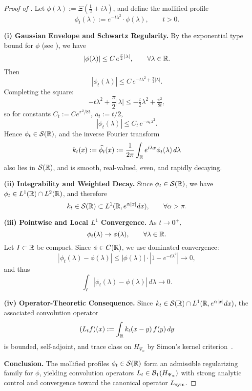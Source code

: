 \begin{proof}[Proof of ]
Let \( \phi(\lambda) := \Xi\left( \tfrac{1}{2} + i\lambda \right) \), and define the mollified profile
\[
\phi_t(\lambda) := e^{-t\lambda^2} \cdot \phi(\lambda), \qquad t > 0.
\]

\smallskip
\noindent\textbf{(i) Gaussian Envelope and Schwartz Regularity.}  
By the exponential type bound for \( \phi \) (see ), we have
\[
|\phi(\lambda)| \le C\, e^{\frac{\pi}{2} |\lambda|}, \qquad \forall \lambda \in \mathbb{R}.
\]
Then
\[
|\phi_t(\lambda)| \le C\, e^{-t\lambda^2 + \frac{\pi}{2} |\lambda|}.
\]
Completing the square:
\[
-t\lambda^2 + \frac{\pi}{2}|\lambda| \le -\tfrac{t}{2} \lambda^2 + \tfrac{\pi^2}{8t},
\]
so for constants \( C_t := C e^{\pi^2 / 8t} \), \( a_t := t/2 \),
\[
|\phi_t(\lambda)| \le C_t\, e^{-a_t \lambda^2}.
\]
Hence \( \phi_t \in \mathcal{S}(\mathbb{R}) \), and the inverse Fourier transform
\[
k_t(x) := \widehat{\phi_t}(x) := \frac{1}{2\pi} \int_{\mathbb{R}} e^{i\lambda x} \phi_t(\lambda)\, d\lambda
\]
also lies in \( \mathcal{S}(\mathbb{R}) \), and is smooth, real-valued, even, and rapidly decaying.

\smallskip
\noindent\textbf{(ii) Integrability and Weighted Decay.}  
Since \( \phi_t \in \mathcal{S}(\mathbb{R}) \), we have \( \phi_t \in L^1(\mathbb{R}) \cap L^2(\mathbb{R}) \), and therefore
\[
k_t \in \mathcal{S}(\mathbb{R}) \subset L^1(\mathbb{R}, e^{\alpha |x|} dx), \qquad \forall \alpha > \pi.
\]

\smallskip
\noindent\textbf{(iii) Pointwise and Local \( L^1 \) Convergence.}  
As \( t \to 0^+ \),
\[
\phi_t(\lambda) \to \phi(\lambda), \qquad \forall \lambda \in \mathbb{R}.
\]
Let \( I \subset \mathbb{R} \) be compact. Since \( \phi \in C(\mathbb{R}) \), we use dominated convergence:
\[
|\phi_t(\lambda) - \phi(\lambda)| \le |\phi(\lambda)| \cdot |1 - e^{-t\lambda^2}| \to 0,
\]
and thus
\[
\int_I |\phi_t(\lambda) - \phi(\lambda)|\, d\lambda \to 0.
\]

\smallskip
\noindent\textbf{(iv) Operator-Theoretic Consequence.}  
Since \( k_t \in \mathcal{S}(\mathbb{R}) \cap L^1(\mathbb{R}, e^{\alpha |x|} dx) \), the associated convolution operator
\[
(L_t f)(x) := \int_{\mathbb{R}} k_t(x - y)\, f(y)\, dy
\]
is bounded, self-adjoint, and trace class on \( H_{\Psi_\alpha} \) by Simon’s kernel criterion~\cite[Thm.~4.2]{Simon2005TraceIdeals}.

\smallskip
\noindent\textbf{Conclusion.}  
The mollified profiles \( \phi_t \in \mathcal{S}(\mathbb{R}) \) form an admissible regularizing family for \( \phi \), yielding convolution operators \( L_t \in \mathcal{B}_1(H_{\Psi_\alpha}) \) with strong analytic control and convergence toward the canonical operator \( L_{\mathrm{sym}} \).
\end{proof}
